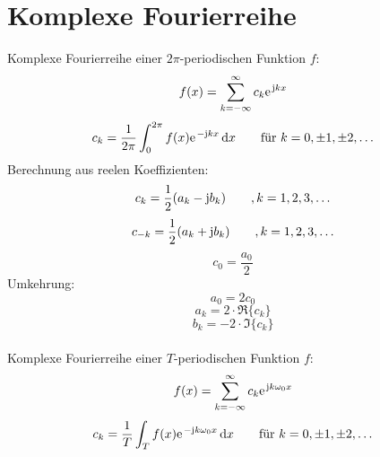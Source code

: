\section{Komplexe Fourierreihe}
Komplexe Fourierreihe einer $2\pi$-periodischen Funktion $f$:
\[ f(x) = \sum_{k=-\infty}^{\infty}c_k \e^{\im kx} \]
\[ c_k = \frac{1}{2\pi}\int_{0}^{2\pi}f(x)\e^{-\im kx}\di x \qquad \text{für }k=0,\pm1,\pm2,\ldots \]
Berechnung aus reelen Koeffizienten:
\[ c_k = \frac{1}{2}(a_k-\im b_k) \qquad,k=1,2,3,\ldots \]
\[ c_{-k} = \frac{1}{2}(a_k+\im b_k) \qquad,k=1,2,3,\ldots \]
\[ c_0 = \frac{a_0}{2} \]
Umkehrung:
\[ a_0 = 2c_0 \]
\[ a_k = 2\cdot\Re\lbrace c_k\rbrace \]
\[ b_k = -2\cdot\Im\lbrace c_k\rbrace \]
~\\
Komplexe Fourierreihe einer $T$-periodischen Funktion $f$:
\[ f(x) = \sum_{k=-\infty}^{\infty}c_k \e^{\im k\omega_0x} \]
\[ c_k = \frac{1}{T}\int_{T}f(x)\e^{-\im k\omega_0x}\di x \qquad \text{für }k=0,\pm1,\pm2,\ldots \]